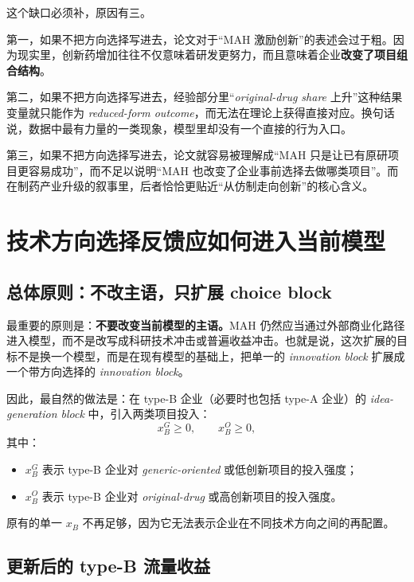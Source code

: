 \documentclass[12pt]{ctexart}
\begin{document}
这个缺口必须补，原因有三。

第一，如果不把方向选择写进去，论文对于“MAH 激励创新”的表述会过于粗。因为现实里，创新药增加往往不仅意味着研发更努力，而且意味着企业\textbf{改变了项目组合结构}。

第二，如果不把方向选择写进去，经验部分里“\textit{original-drug share} 上升”这种结果变量就只能作为 \textit{reduced-form outcome}，而无法在理论上获得直接对应。换句话说，数据中最有力量的一类现象，模型里却没有一个直接的行为入口。

第三，如果不把方向选择写进去，论文就容易被理解成“MAH 只是让已有原研项目更容易成功”，而不足以说明“MAH 也改变了企业事前选择去做哪类项目”。而在制药产业升级的叙事里，后者恰恰更贴近“从仿制走向创新”的核心含义。

\section{技术方向选择反馈应如何进入当前模型}

\subsection{总体原则：不改主语，只扩展 choice block}

最重要的原则是：\textbf{不要改变当前模型的主语。}MAH 仍然应当通过外部商业化路径进入模型，而不是改写成科研技术冲击或普遍收益冲击。也就是说，这次扩展的目标不是换一个模型，而是在现有模型的基础上，把单一的 \textit{innovation block} 扩展成一个带方向选择的 \textit{innovation block}。

因此，最自然的做法是：在 type-B 企业（必要时也包括 type-A 企业）的 \textit{idea-generation block} 中，引入两类项目投入：
\[
x_B^G \ge 0, \qquad x_B^O \ge 0,
\]
其中：
\begin{itemize}[leftmargin=2em]
    \item $x_B^G$ 表示 type-B 企业对 \textit{generic-oriented} 或低创新项目的投入强度；
    \item $x_B^O$ 表示 type-B 企业对 \textit{original-drug} 或高创新项目的投入强度。
\end{itemize}
原有的单一 $x_B$ 不再足够，因为它无法表示企业在不同技术方向之间的再配置。

\subsection{更新后的 type-B 流量收益}
\end{document}
